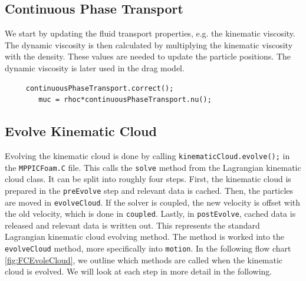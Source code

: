 \subsection{Continuous Phase Transport}
We start by updating the fluid transport properties, e.g. the kinematic viscosity.
The dynamic viscosity is then calculated by multiplying the kinematic viscosity with the density.
These values are needed to update the particle positions. The dynamic viscosity is later used in the drag model.

\ifcode
 \begin{lstlisting}
     continuousPhaseTransport.correct();
        muc = rhoc*continuousPhaseTransport.nu();
 \end{lstlisting}
\fi
\subsection{Evolve Kinematic Cloud}
Evolving the kinematic cloud is done by calling \lstinline|kinematicCloud.evolve();| in the \lstinline|MPPICFoam.C| file. This calls the \lstinline|solve| method from the Lagrangian kinematic cloud class.
It can be split into roughly four steps. First, the kinematic cloud is prepared in the \lstinline|preEvolve| step and relevant data is cached. Then, the particles are moved in \lstinline|evolveCloud|. 
If the solver is coupled, the new velocity is offset with the old velocity, which is done in \lstinline|coupled|.
Lastly, in \lstinline|postEvolve|, cached data is released and relevant data is written out.
This represents the standard Lagrangian kinematic cloud evolving method.
The \MP method is worked into the \lstinline|evolveCloud| method, more specifically into \lstinline|motion|.
In the following flow chart \ref{fig:FCEvoleCloud}, we outline which methods are called when the kinematic cloud is evolved.
We will look at each step in more detail in the following.


